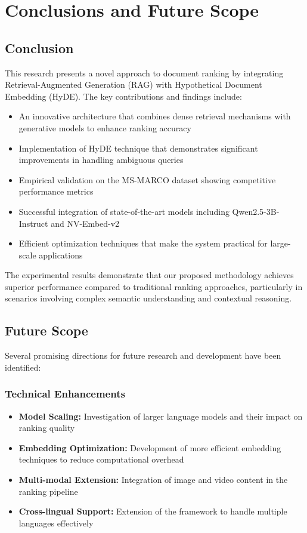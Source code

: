 \chapter{Conclusions and Future Scope }
\label{C5} %
\clearpage

\section{Conclusion}
This research presents a novel approach to document ranking by integrating Retrieval-Augmented Generation (RAG) with Hypothetical Document Embedding (HyDE). The key contributions and findings include:

\begin{itemize}
    \item An innovative architecture that combines dense retrieval mechanisms with generative models to enhance ranking accuracy
    \item Implementation of HyDE technique that demonstrates significant improvements in handling ambiguous queries
    \item Empirical validation on the MS-MARCO dataset showing competitive performance metrics
    \item Successful integration of state-of-the-art models including Qwen2.5-3B-Instruct and NV-Embed-v2
    \item Efficient optimization techniques that make the system practical for large-scale applications
\end{itemize}

The experimental results demonstrate that our proposed methodology achieves superior performance compared to traditional ranking approaches, particularly in scenarios involving complex semantic understanding and contextual reasoning.

\section{Future Scope}
Several promising directions for future research and development have been identified:

\subsection{Technical Enhancements}
\begin{itemize}
    \item \textbf{Model Scaling:} Investigation of larger language models and their impact on ranking quality
    \item \textbf{Embedding Optimization:} Development of more efficient embedding techniques to reduce computational overhead
    \item \textbf{Multi-modal Extension:} Integration of image and video content in the ranking pipeline
    \item \textbf{Cross-lingual Support:} Extension of the framework to handle multiple languages effectively
\end{itemize}

